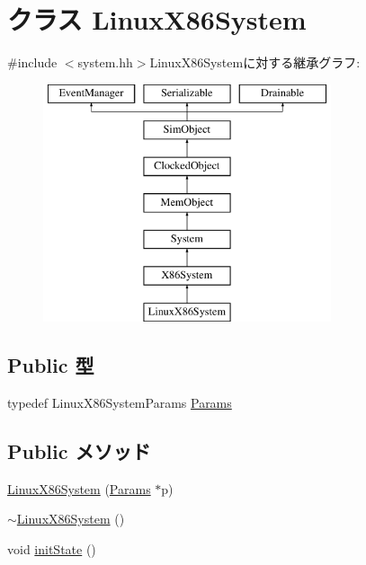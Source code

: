 \hypertarget{classLinuxX86System}{
\section{クラス LinuxX86System}
\label{classLinuxX86System}
}


{\ttfamily \#include $<$system.hh$>$}LinuxX86Systemに対する継承グラフ:\begin{figure}[H]
\begin{center}
\leavevmode
\includegraphics[height=7cm]{classLinuxX86System}
\end{center}
\end{figure}
\subsection*{Public 型}
\begin{DoxyCompactItemize}
\item 
typedef LinuxX86SystemParams \hyperlink{classLinuxX86System_a9a9d4fd080ddd5d649f7db5e47cfae8b}{Params}
\end{DoxyCompactItemize}
\subsection*{Public メソッド}
\begin{DoxyCompactItemize}
\item 
\hyperlink{classLinuxX86System_aa374e3ca639a89127a1ee9b0b6c0b346}{LinuxX86System} (\hyperlink{classLinuxX86System_a9a9d4fd080ddd5d649f7db5e47cfae8b}{Params} $\ast$p)
\item 
\hyperlink{classLinuxX86System_ab5ad28d8a836f69bc8acbdd69d703062}{$\sim$LinuxX86System} ()
\item 
void \hyperlink{classLinuxX86System_a3c34ea9b29f410748d4435a667484924}{initState} ()
\end{DoxyCompactItemize}
